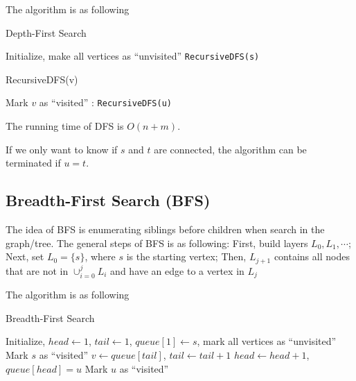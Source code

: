 					The algorithm is as following
					\begin{algorithm}[h]
						\caption{Depth-First Search}
						\begin{algorithmic}[1]
							\State Initialize, make all vertices as ``unvisited''
							\State \texttt{RecursiveDFS(s)}
						\end{algorithmic}
					\end{algorithm}

					\begin{algorithm}[h]
						\caption{RecursiveDFS(v)}
						\begin{algorithmic}[1]
							\State Mark $v$ as ``visited''
							:
									\State \texttt{RecursiveDFS(u)}
								\EndIf
							\EndFor
						\end{algorithmic}
					\end{algorithm}

					The running time of DFS is $O(n + m)$.

					If we only want to know if $s$ and $t$ are connected, the algorithm can be terminated if $u = t$.

				\subsection{Breadth-First Search (BFS)}
					The idea of BFS is enumerating siblings before children when search in the graph/tree. The general steps of BFS is as following: First, build layers $L_0, L_1, \cdots$; Next, set $L_0 = \{s\}$, where $s$ is the starting vertex; Then, $L_{j + 1}$ contains all nodes that are not in $\cup_{i = 0}^j L_i$ and have an edge to a vertex in $L_j$

					The algorithm is as following
					\begin{algorithm}[h]
						\caption{Breadth-First Search}
						\begin{algorithmic}[1]
							\State Initialize, $head \gets 1$, $tail \gets 1$, $queue[1] \gets s$, mark all vertices as ``unvisited''
							\State Mark $s$ as ``visited''
								\State $v \gets queue[tail]$, $tail \gets tail + 1$
										\State $head \gets head + 1$, $queue[head] = u$
										\State Mark $u$ as ``visited''
									\EndIf
								\EndFor
							\EndWhile
						\end{algorithmic}
					\end{algorithm}

